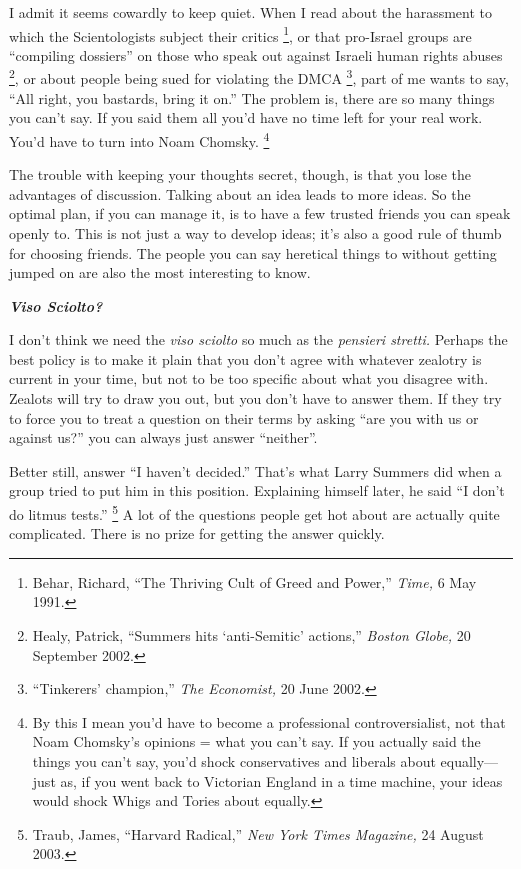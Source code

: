 \documentclass[12pt]{book}
\begin{document}
I admit it seems cowardly to keep quiet. When I read about the
harassment to which the Scientologists subject their critics \footnote{Behar, Richard, ``The Thriving Cult of Greed and Power,''
\emph{Time,} 6 May 1991.},
or that pro-Israel groups are ``compiling dossiers'' on those who speak
out against Israeli human rights abuses \footnote{Healy, Patrick, ``Summers hits `anti-Semitic' actions,''
\emph{Boston Globe,} 20 September 2002.}, or about people being
sued for violating the DMCA \footnote{``Tinkerers' champion,'' \emph{The Economist,} 20 June 2002.}, part of me wants to say, ``All
right, you bastards, bring it on.'' The problem is, there are so many
things you can't say. If you said them all you'd have no time left for
your real work. You'd have to turn into Noam Chomsky. \footnote{By this I mean you'd have to become a professional
controversialist, not that Noam Chomsky's opinions = what you can't say.
If you actually said the things you can't say, you'd shock conservatives
and liberals about equally---just as, if you went back to Victorian
England in a time machine, your ideas would shock Whigs and Tories about
equally.}

The trouble with keeping your thoughts secret, though, is that you lose
the advantages of discussion. Talking about an idea leads to more ideas.
So the optimal plan, if you can manage it, is to have a few trusted
friends you can speak openly to. This is not just a way to develop
ideas; it's also a good rule of thumb for choosing friends. The people
you can say heretical things to without getting jumped on are also the
most interesting to know.

\textbf{\emph{Viso Sciolto?}}

I don't think we need the \emph{viso sciolto} so much as the
\emph{pensieri stretti.} Perhaps the best policy is to make it plain
that you don't agree with whatever zealotry is current in your time, but
not to be too specific about what you disagree with. Zealots will try to
draw you out, but you don't have to answer them. If they try to force
you to treat a question on their terms by asking ``are you with us or
against us?'' you can always just answer ``neither''.

Better still, answer ``I haven't decided.'' That's what Larry Summers
did when a group tried to put him in this position. Explaining himself
later, he said ``I don't do litmus tests.'' \footnote{Traub, James, ``Harvard Radical,'' \emph{New York Times
Magazine,} 24 August 2003.} A lot of the
questions people get hot about are actually quite complicated. There is
no prize for getting the answer quickly.
\end{document}
